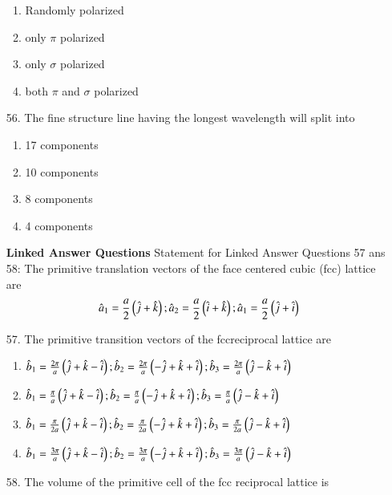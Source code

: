 \documentclass[journal]{IEEEtran}
\begin{document}
\begin{enumerate}
\begin{enumerate}[label=(\Alph*)]
        \item Randomly polarized
        \item only $\pi$ polarized
        \item only $\sigma$ polarized
        \item both $\pi$ and $\sigma$ polarized
     \end{enumerate}
     \item[56.]  The fine structure line having the longest wavelength will split into
     \begin{enumerate}[label=(\Alph*)]
        \item  17 components
        \item  10 components
        \item  8 components
        \item  4 components
     \end{enumerate}
     \textbf{Linked Answer Questions}
     Statement for Linked Answer Questions 57 ans 58:
    The primitive translation vectors of the face centered cubic (fcc) lattice are 
    $$\hat{a}_1 = \frac{a}{2}\left(\hat{j}+\hat{k}\right);\hat{a}_2 = \frac{a}{2}\left(\hat{i}+\hat{k}\right);\hat{a}_1 = \frac{a}{2}\left(\hat{j}+\hat{i}\right)$$
    \item[57.] The primitive transition vectors of the fccreciprocal lattice are 
    \begin{enumerate}[label=(\Alph*)]
        \item $\hat{b}_1 = \frac{2\pi}{a}\left(\hat{j}+\hat{k}-\hat{i}\right);\hat{b}_2 = \frac{2\pi}{a}\left(-\hat{j}+\hat{k}+\hat{i}\right);\hat{b}_3 = \frac{2\pi}{a}\left(\hat{j}-\hat{k}+\hat{i}\right)$
        \item $\hat{b}_1 = \frac{\pi}{a}\left(\hat{j}+\hat{k}-\hat{i}\right);\hat{b}_2 = \frac{\pi}{a}\left(-\hat{j}+\hat{k}+\hat{i}\right);\hat{b}_3 = \frac{\pi}{a}\left(\hat{j}-\hat{k}+\hat{i}\right)$
        \item $\hat{b}_1 = \frac{\pi}{2a}\left(\hat{j}+\hat{k}-\hat{i}\right);\hat{b}_2 = \frac{\pi}{2a}\left(-\hat{j}+\hat{k}+\hat{i}\right);\hat{b}_3 = \frac{\pi}{2a}\left(\hat{j}-\hat{k}+\hat{i}\right)$
        \item $\hat{b}_1 = \frac{3\pi}{a}\left(\hat{j}+\hat{k}-\hat{i}\right);\hat{b}_2 = \frac{3\pi}{a}\left(-\hat{j}+\hat{k}+\hat{i}\right);\hat{b}_3 = \frac{3\pi}{a}\left(\hat{j}-\hat{k}+\hat{i}\right)$
    \end{enumerate}
    \item[58.] The volume of the primitive cell of the fcc reciprocal lattice is
    \begin{enumerate}[label=(\Alph*)]

\end{enumerate}
\end{enumerate}
\end{document}
